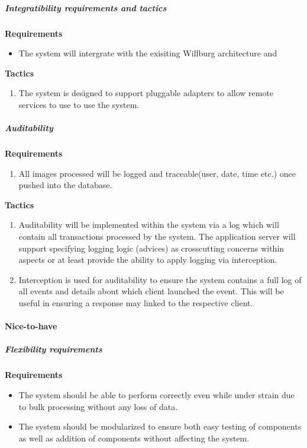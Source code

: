 \documentclass[a4paper,12pt]{report}
\begin{document}
			\subparagraph{Integratibility requirements and tactics}
				\hfill \break
				\hfill \break
				\textbf{Requirements}
					\begin{itemize}
						\item The system will intergrate with the exisiting Willburg architecture and 
					\end{itemize}
				
				\hfill \break
				\textbf{Tactics}
					\begin{enumerate}
						\item The system is designed to support pluggable adapters to allow remote services to use to use the system.
					\end{enumerate}
			\newpage
			\subparagraph{Auditability}
				\hfill \break
				\hfill \break
				\textbf{Requirements}
					\begin{enumerate}
						\item All images processed will be logged and traceable(user, date, time etc.) once pushed into the database.
					\end{enumerate}
				\hfill \break	
				\textbf{Tactics}
					\begin{enumerate}
						\item Auditability will be implemented within the system via a log which will contain all transactions processed by the system. The application server will support specifying logging logic (advices) as crosscutting concerns within aspects or at least provide the ability to apply logging via interception.
						\item Interception is used for auditability to ensure the system contains a full log of all events and details about which client launched the event. This will be useful in ensuring a response may linked to the respective client.
					\end{enumerate}



	\paragraph {Nice-to-have}

		\subparagraph{Flexibility requirements}
			\hfill \break
			\hfill \break
			\textbf{Requirements}
				\begin{itemize}
					\item The system should be able to perform correctly even while under strain due to bulk processing without any loss of data.
					\item The system should be modularized to ensure both easy testing of components as well as addition of components without affecting the system.
				\end{itemize}
\end{document}
